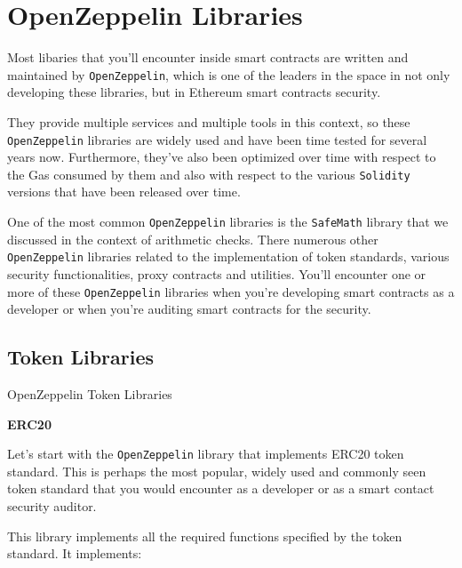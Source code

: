 \section{OpenZeppelin Libraries}\label{openzeppelin-libraries}

Most libaries that you'll encounter inside smart contracts are written
and maintained by \texttt{OpenZeppelin}, which is one of the leaders in
the space in not only developing these libraries, but in Ethereum smart
contracts security.

They provide multiple services and multiple tools in this context, so
these \texttt{OpenZeppelin} libraries are widely used and have been time
tested for several years now. Furthermore, they've also been optimized
over time with respect to the Gas consumed by them and also with respect
to the various \texttt{Solidity} versions that have been released over
time.

One of the most common \texttt{OpenZeppelin} libraries is the
\texttt{SafeMath} library that we discussed in the context of arithmetic
checks. There numerous other \texttt{OpenZeppelin} libraries related to
the implementation of token standards, various security functionalities,
proxy contracts and utilities. You'll encounter one or more of these
\texttt{OpenZeppelin} libraries when you're developing smart contracts
as a developer or when you're auditing smart contracts for the security.

\subsection{Token Libraries}\label{token-libraries}

OpenZeppelin Token Libraries

\textbf{ERC20}

Let's start with the \texttt{OpenZeppelin} library that implements ERC20
token standard. This is perhaps the most popular, widely used and
commonly seen token standard that you would encounter as a developer or
as a smart contact security auditor.

This library implements all the required functions specified by the
token standard. It implements:


